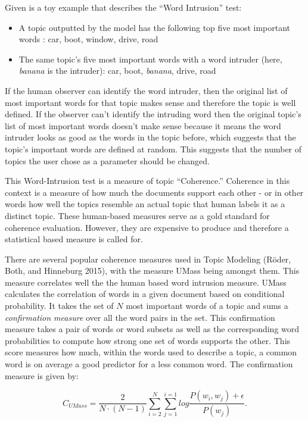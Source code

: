 \documentclass[
]{article}
\providecommand{\tightlist}{%
  \setlength{\itemsep}{0pt}\setlength{\parskip}{0pt}}
\begin{document}
Given is a toy example that describes the ``Word Intrusion'' test:

\begin{itemize}
\tightlist
\item
  A topic outputted by the model has the following top five most
  important words : car, boot, window, drive, road
\item
  The same topic's five most important words with a word intruder (here,
  \emph{banana} is the intruder): car, boot, \emph{banana}, drive, road
\end{itemize}

If the human observer can identify the word intruder, then the original
list of most important words for that topic makes sense and therefore
the topic is well defined. If the observer can't identify the intruding
word then the original topic's list of most important words doesn't make
sense because it means the word intruder looks as good as the words in
the topic before, which suggests that the topic's important words are
defined at random. This suggests that the number of topics the user
chose as a parameter should be changed.

This Word-Intrusion test is a measure of topic ``Coherence.'' Coherence
in this context is a measure of how much the documents support each
other - or in other words how well the topics resemble an actual topic
that human labels it as a distinct topic. These human-based measures
serve as a gold standard for coherence evaluation. However, they are
expensive to produce and therefore a statistical based measure is called
for.

There are several popular coherence measures used in Topic Modeling
(Röder, Both, and Hinneburg 2015), with the measure UMass being amongst
them. This measure correlates well the the human based word intrusion
measure. UMass calculates the correlation of words in a given document
based on conditional probability. It takes the set of \(N\) most
important words of a topic and sums a \emph{confirmation measure} over
all the word pairs in the set. This confirmation measure takes a pair of
words or word subsets as well as the corresponding word probabilities to
compute how strong one set of words supports the other. This score
measures how much, within the words used to describe a topic, a common
word is on average a good predictor for a less common word. The
confirmation measure is given by:

\begin{equation}
C_{UMass} = \frac{2}{N\cdot(N-1) } \sum_{i=2}^{N}\sum_{j=1}^{i=1}log\frac{P(w_i,w_j)+\epsilon }{P(w_j)}.
\end{equation}
\end{document}
